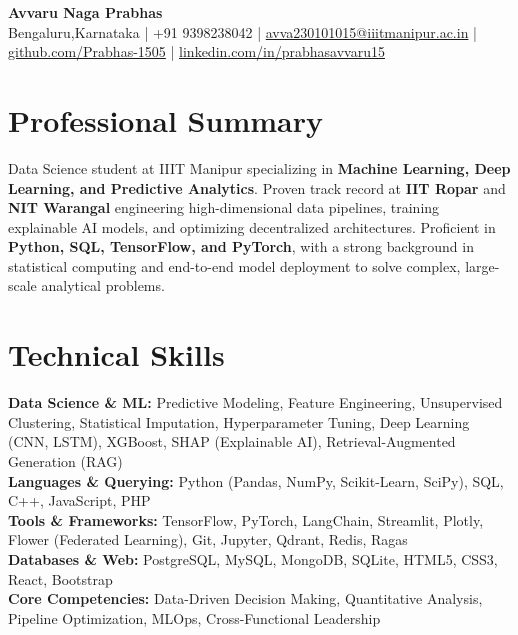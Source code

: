 \documentclass[9.5pt,a4paper]{article}
\begin{document}
\pagestyle{empty}

\begin{center}
  {\Large\textbf{Avvaru Naga Prabhas}}\\[3pt]
  {\small
    Bengaluru,Karnataka | +91 9398238042 |
    \href{mailto:avvaru230101015@iiitmanipur.ac.in}{avva230101015@iiitmanipur.ac.in} |
    \href{https://github.com/Prabhas-1505}{github.com/Prabhas-1505} |
    \href{https://linkedin.com/in/prabhasavvaru15}{linkedin.com/in/prabhasavvaru15}
  }
\end{center}
\vspace{1pt}

\section{Professional Summary}
{\small
Data Science student at IIIT Manipur specializing in \textbf{Machine Learning, Deep Learning, and Predictive Analytics}. Proven track record at \textbf{IIT Ropar} and \textbf{NIT Warangal} engineering high-dimensional data pipelines, training explainable AI models, and optimizing decentralized architectures. Proficient in \textbf{Python, SQL, TensorFlow, and PyTorch}, with a strong background in statistical computing and end-to-end model deployment to solve complex, large-scale analytical problems.
}

\section{Technical Skills}
{\small
\textbf{Data Science \& ML:} Predictive Modeling, Feature Engineering, Unsupervised Clustering, Statistical Imputation, Hyperparameter Tuning, Deep Learning (CNN, LSTM), XGBoost, SHAP (Explainable AI), Retrieval-Augmented Generation (RAG) \\
\textbf{Languages \& Querying:} Python (Pandas, NumPy, Scikit-Learn, SciPy), SQL, C++, JavaScript, PHP \\
\textbf{Tools \& Frameworks:} TensorFlow, PyTorch, LangChain, Streamlit, Plotly, Flower (Federated Learning), Git, Jupyter, Qdrant, Redis, Ragas \\
\textbf{Databases \& Web:} PostgreSQL, MySQL, MongoDB, SQLite, HTML5, CSS3, React, Bootstrap \\
\textbf{Core Competencies:} Data-Driven Decision Making, Quantitative Analysis, Pipeline Optimization, MLOps, Cross-Functional Leadership
}
\end{document}
